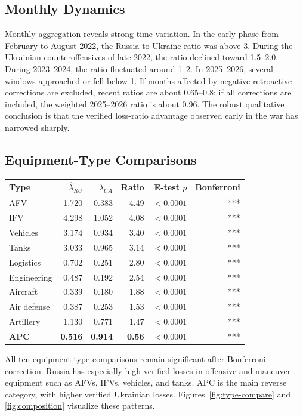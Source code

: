 \documentclass[a4paper,11pt]{article}
\begin{document}
\subsection{Monthly Dynamics}

Monthly aggregation reveals strong time variation. In the early phase from February to August 2022, the Russia-to-Ukraine ratio was above 3. During the Ukrainian counteroffensives of late 2022, the ratio declined toward 1.5--2.0. During 2023--2024, the ratio fluctuated around 1--2. In 2025--2026, several windows approached or fell below 1. If months affected by negative retroactive corrections are excluded, recent ratios are about 0.65--0.8; if all corrections are included, the weighted 2025--2026 ratio is about 0.96. The robust qualitative conclusion is that the verified loss-ratio advantage observed early in the war has narrowed sharply.

\subsection{Equipment-Type Comparisons}

\begin{longtable}{lrrrrr}
\toprule
Type & $\hat{\lambda}_{RU}$ & $\hat{\lambda}_{UA}$ & Ratio & E-test $p$ & Bonferroni \\
\midrule
\endhead
AFV & 1.720 & 0.383 & 4.49 & $<0.0001$ & *** \\
IFV & 4.298 & 1.052 & 4.08 & $<0.0001$ & *** \\
Vehicles & 3.174 & 0.934 & 3.40 & $<0.0001$ & *** \\
Tanks & 3.033 & 0.965 & 3.14 & $<0.0001$ & *** \\
Logistics & 0.702 & 0.251 & 2.80 & $<0.0001$ & *** \\
Engineering & 0.487 & 0.192 & 2.54 & $<0.0001$ & *** \\
Aircraft & 0.339 & 0.180 & 1.88 & $<0.0001$ & *** \\
Air defense & 0.387 & 0.253 & 1.53 & $<0.0001$ & *** \\
Artillery & 1.130 & 0.771 & 1.47 & $<0.0001$ & *** \\
\textbf{APC} & \textbf{0.516} & \textbf{0.914} & \textbf{0.56} & $<0.0001$ & *** \\
\bottomrule
\end{longtable}

All ten equipment-type comparisons remain significant after Bonferroni correction. Russia has especially high verified losses in offensive and maneuver equipment such as AFVs, IFVs, vehicles, and tanks. APC is the main reverse category, with higher verified Ukrainian losses. Figures~\ref{fig:type-compare} and \ref{fig:composition} visualize these patterns.
\end{document}
